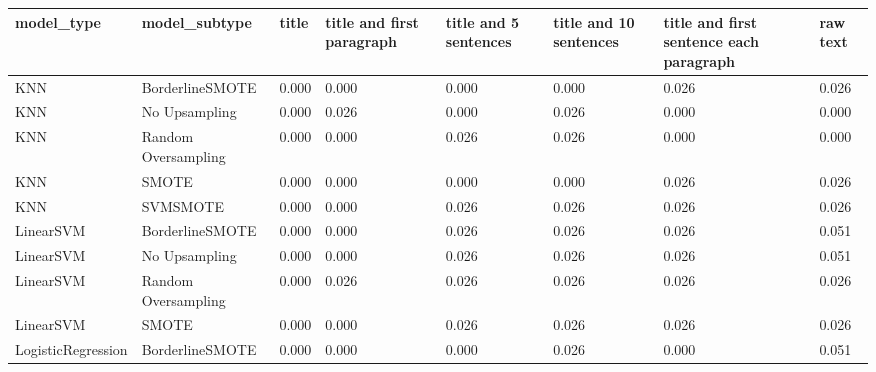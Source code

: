\begin{tabular}{llllllll}
\toprule
                  model\_type &       model\_subtype & title & title and first paragraph & title and 5 sentences & title and 10 sentences & title and first sentence each paragraph &  raw text \\
\midrule
                         KNN &     BorderlineSMOTE & 0.000 &                     0.000 &                 0.000 &                  0.000 &                                   0.026 &     0.026 \\
                         KNN &       No Upsampling & 0.000 &                     0.026 &                 0.000 &                  0.026 &                                   0.000 &     0.000 \\
                         KNN & Random Oversampling & 0.000 &                     0.000 &                 0.026 &                  0.026 &                                   0.000 &     0.000 \\
                         KNN &               SMOTE & 0.000 &                     0.000 &                 0.000 &                  0.000 &                                   0.026 &     0.026 \\
                         KNN &            SVMSMOTE & 0.000 &                     0.000 &                 0.026 &                  0.026 &                                   0.026 &     0.026 \\
                   LinearSVM &     BorderlineSMOTE & 0.000 &                     0.000 &                 0.026 &                  0.026 &                                   0.026 &     0.051 \\
                   LinearSVM &       No Upsampling & 0.000 &                     0.000 &                 0.026 &                  0.026 &                                   0.026 &     0.051 \\
                   LinearSVM & Random Oversampling & 0.000 &                     0.026 &                 0.026 &                  0.026 &                                   0.026 &     0.026 \\
                   LinearSVM &               SMOTE & 0.000 &                     0.000 &                 0.026 &                  0.026 &                                   0.026 &     0.026 \\
          LogisticRegression &     BorderlineSMOTE & 0.000 &                     0.000 &                 0.000 &                  0.026 &                                   0.000 &     0.051 \\

\end{tabular}
